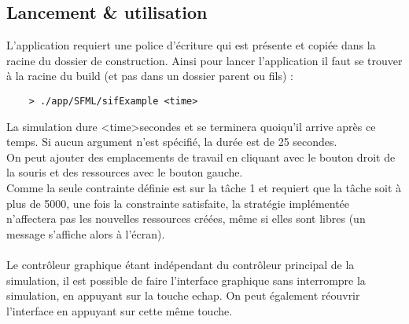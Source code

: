 \subsection{Lancement \& utilisation}

L'application requiert une police d'écriture qui est présente et copiée dans la racine du dossier de construction. Ainsi pour lancer l'application il faut se trouver à la racine du build (et pas dans un dossier parent ou fils) :

\begin{verbatim}
    > ./app/SFML/sifExample <time>
\end{verbatim}

La simulation dure \textless time\textgreater secondes et se terminera quoiqu'il arrive après ce temps. Si aucun argument n'est spécifié, la durée est de 25 secondes.\\
On peut ajouter des emplacements de travail en cliquant avec le bouton droit de la souris et des ressources avec le bouton gauche.\\
Comme la seule contrainte définie est sur la tâche 1 et requiert que la tâche soit à plus de 5000, une fois la constrainte satisfaite, la stratégie implémentée n'affectera pas les nouvelles ressources créées, même si elles sont libres (un message s'affiche alors à l'écran).\\\\

Le contrôleur graphique étant indépendant du contrôleur principal de la simulation, il est possible de faire l'interface graphique sans interrompre la simulation, en appuyant sur la touche echap. On peut également réouvrir l'interface en appuyant sur cette même touche.
